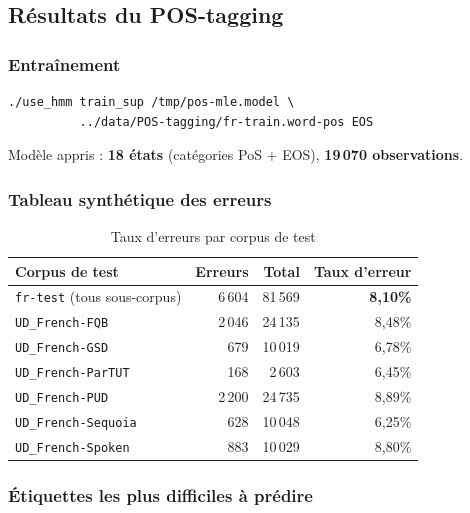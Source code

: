 \documentclass[12pt,a4paper]{article}
\begin{document}
\subsection{Résultats du POS-tagging}

\subsubsection*{Entraînement}

\begin{lstlisting}[style=bashstyle]
./use_hmm train_sup /tmp/pos-mle.model \
          ../data/POS-tagging/fr-train.word-pos EOS
\end{lstlisting}

Modèle appris : \textbf{18 états} (catégories PoS + EOS), \textbf{19\,070 observations}.

\subsubsection*{Tableau synthétique des erreurs}

\begin{table}[H]
\centering
\caption{Taux d'erreurs par corpus de test}
\begin{tabular}{lrrr}
\toprule
\textbf{Corpus de test} & \textbf{Erreurs} & \textbf{Total} & \textbf{Taux d'erreur} \\
\midrule
\texttt{fr-test} (tous sous-corpus) & 6\,604 & 81\,569 & \textbf{8,10\%} \\
\texttt{UD\_French-FQB}             & 2\,046 & 24\,135 & 8,48\% \\
\texttt{UD\_French-GSD}             &    679 & 10\,019 & 6,78\% \\
\texttt{UD\_French-ParTUT}          &    168 &  2\,603 & 6,45\% \\
\texttt{UD\_French-PUD}             & 2\,200 & 24\,735 & 8,89\% \\
\texttt{UD\_French-Sequoia}         &    628 & 10\,048 & 6,25\% \\
\texttt{UD\_French-Spoken}          &    883 & 10\,029 & 8,80\% \\
\bottomrule
\end{tabular}
\end{table}

\subsubsection*{Étiquettes les plus difficiles à prédire}
\end{document}
